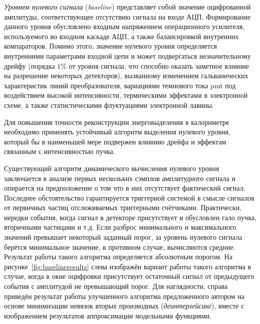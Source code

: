 \emph{Уровнем нулевого сигнала} (\emph{baseline}) представляет собой значение оцифрованной амплитуды, соответствующее отсутствию сигнала на входе АЦП.
Формирование данного уровня обусловлено входным напряжением операционного
усилителя, используемого во входном каскаде АЦП, а также балансировкой
внутренних компараторов. Помимо этого, значение нулевого уровня определяется
внутренними параметрами входной цепи и может подвергаться незначительному
дрейфу (порядка $1 \%$ от уровня сигнала, что способно оказать заметное
влияние на разрешение некоторых детекторов), вызванному изменением
гальванических характеристик линий преобразователя, вариациями темнового
тока \acrshort{pmt} под воздействием высокой интенсивности, термическими эффектами
в электронной схеме, а также статистическими флуктуациями электронной
лавины.

Для повышения точности реконструкции энерговыделения в калориметре
необходимо применять устойчивый алгоритм выделения нулевого уровня, который бы
в наименьшей мере подвержен влиянию дрейфа и эффектам связанным с
интенсивностью пучка.

Существующий алгоритм динамического вычисления нулевого уровня заключается
в анализе первых нескольких сэмплов амплитудного сигнала и опирается на
предположение о том что в них отсутствует фактический сигнал. Последнее
обстоятельство гарантируется триггерной системой в смысле сигналов от
первичных частиц отслеживаемых триггерными счётчиками. Практически, нередки
события, когда сигнал в детекторе присутствует и обусловлен гало пучка, 
вторичными частицами и т.д. Если разброс
минимального и максимального значений превышает некоторый заданный порог,
за уровень нулевого сигнала берётся минимальное значение, в противном случае,
вычисляются средние. Результат работы такого алгоритма определяется
абсолютным порогом. На рисунке~\ref{fig:baselineresults} слева изображён
вариант работы такого алгоритма в случае, когда в окне оцифровки присутствует
остаточный сигнал от предыдущего события с амплитудой не превышающий
порог. Для наглядности, справа приведён результат работы улучшенного
алгоритма предложенного автором на основе минимизации невязок вторых
производных (\emph{деинтерлейсинг}), вместе с изображением результатов
аппроксимации модельными функциями.

